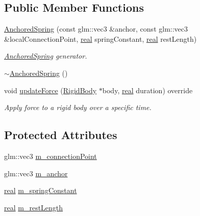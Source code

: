 \subsection*{Public Member Functions}
\begin{DoxyCompactItemize}
\item 
\mbox{\hyperlink{classr3_1_1_anchored_spring_a944423598dfb2e3f080f9f9850c8aa13}{Anchored\+Spring}} (const glm\+::vec3 \&anchor, const glm\+::vec3 \&local\+Connection\+Point, \mbox{\hyperlink{namespacer3_ab2016b3e3f743fb735afce242f0dc1eb}{real}} spring\+Constant, \mbox{\hyperlink{namespacer3_ab2016b3e3f743fb735afce242f0dc1eb}{real}} rest\+Length)
\begin{DoxyCompactList}\small\item\em \mbox{\hyperlink{classr3_1_1_anchored_spring}{Anchored\+Spring}} generator. \end{DoxyCompactList}\item 
\mbox{\hyperlink{classr3_1_1_anchored_spring_afe612722d8ed0d7a6f0058dcc21eb17f}{$\sim$\+Anchored\+Spring}} ()
\item 
void \mbox{\hyperlink{classr3_1_1_anchored_spring_a3e928bc7fdedc8eb5b302a007200a58c}{update\+Force}} (\mbox{\hyperlink{classr3_1_1_rigid_body}{Rigid\+Body}} $\ast$body, \mbox{\hyperlink{namespacer3_ab2016b3e3f743fb735afce242f0dc1eb}{real}} duration) override
\begin{DoxyCompactList}\small\item\em Apply force to a rigid body over a specific time. \end{DoxyCompactList}\end{DoxyCompactItemize}
\subsection*{Protected Attributes}
\begin{DoxyCompactItemize}
\item 
glm\+::vec3 \mbox{\hyperlink{classr3_1_1_anchored_spring_ac8998ca820fd075aed011136155ec1fb}{m\+\_\+connection\+Point}}
\item 
glm\+::vec3 \mbox{\hyperlink{classr3_1_1_anchored_spring_a1387aec403f6955848fe8c3a28b90a9e}{m\+\_\+anchor}}
\item 
\mbox{\hyperlink{namespacer3_ab2016b3e3f743fb735afce242f0dc1eb}{real}} \mbox{\hyperlink{classr3_1_1_anchored_spring_af17c024b5f8a025f5555946c60b52a67}{m\+\_\+spring\+Constant}}
\item 
\mbox{\hyperlink{namespacer3_ab2016b3e3f743fb735afce242f0dc1eb}{real}} \mbox{\hyperlink{classr3_1_1_anchored_spring_a17441401eb79dd8244a4739a3a574d1a}{m\+\_\+rest\+Length}}
\end{DoxyCompactItemize}
